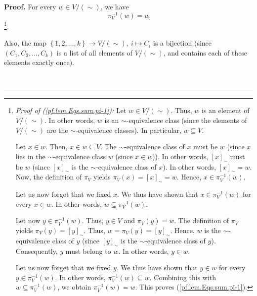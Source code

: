 \documentclass[numbers=enddot,12pt,final,onecolumn,notitlepage]{scrartcl}%
\theoremstyle{definition}
\newenvironment{proof}[1][Proof]{\noindent\textbf{#1.} }{\ \rule{0.5em}{0.5em}}
\newenvironment{verlong}{}{}
\begin{document}
\begin{verlong}
\begin{proof}
For every $w\in V/\left(  \sim\right)  $, we have%
\begin{equation}
\pi_{V}^{-1}\left(  w\right)  =w \label{pf.lem.Eqs.sum.pi-1}%
\end{equation}
\footnote{\textit{Proof of (\ref{pf.lem.Eqs.sum.pi-1}):} Let $w\in V/\left(
\sim\right)  $. Thus, $w$ is an element of $V/\left(  \sim\right)  $. In other
words, $w$ is an $\sim$-equivalence class (since the elements of $V/\left(
\sim\right)  $ are the $\sim$-equivalence classes). In particular, $w\subseteq
V$.
\par
Let $x\in w$. Then, $x\in w\subseteq V$. The $\sim$-equivalence class of $x$
must be $w$ (since $x$ lies in the $\sim$-equivalence class $w$ (since $x\in
w$)). In other words, $\left[  x\right]  _{\sim}$ must be $w$ (since $\left[
x\right]  _{\sim}$ is the $\sim$-equivalence class of $x$). In other words,
$\left[  x\right]  _{\sim}=w$. Now, the definition of $\pi_{V}$ yields
$\pi_{V}\left(  x\right)  =\left[  x\right]  _{\sim}=w$. Hence, $x\in\pi
_{V}^{-1}\left(  w\right)  $.
\par
Let us now forget that we fixed $x$. We thus have shown that $x\in\pi_{V}%
^{-1}\left(  w\right)  $ for every $x\in w$. In other words, $w\subseteq
\pi_{V}^{-1}\left(  w\right)  $.
\par
Let now $y\in\pi_{V}^{-1}\left(  w\right)  $. Thus, $y\in V$ and $\pi
_{V}\left(  y\right)  =w$. The definition of $\pi_{V}$ yields $\pi_{V}\left(
y\right)  =\left[  y\right]  _{\sim}$. Thus, $w=\pi_{V}\left(  y\right)
=\left[  y\right]  _{\sim}$. Hence, $w$ is the $\sim$-equivalence class of $y$
(since $\left[  y\right]  _{\sim}$ is the $\sim$-equivalence class of $y$).
Consequently, $y$ must belong to $w$. In other words, $y\in w$.
\par
Let us now forget that we fixed $y$. We thus have shown that $y\in w$ for
every $y\in\pi_{V}^{-1}\left(  w\right)  $. In other words, $\pi_{V}%
^{-1}\left(  w\right)  \subseteq w$. Combining this with $w\subseteq\pi
_{V}^{-1}\left(  w\right)  $, we obtain $\pi_{V}^{-1}\left(  w\right)  =w$.
This proves (\ref{pf.lem.Eqs.sum.pi-1}).}.

Also, the map $\left\{  1,2,\ldots,k\right\}  \rightarrow V/\left(
\sim\right)  ,\ i\mapsto C_{i}$ is a bijection (since $\left(  C_{1}%
,C_{2},\ldots,C_{k}\right)  $ is a list of all elements of $V/\left(
\sim\right)  $, and contains each of these elements exactly once).


\end{proof}
\end{verlong}
\end{document}
